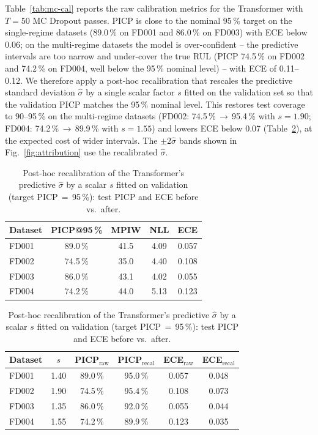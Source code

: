 \documentclass[5p,times,authoryear]{elsarticle}
\begin{document}
Table~\ref{tab:mc-cal} reports the raw calibration metrics for the Transformer with $T{=}50$ MC Dropout passes. PICP is close to the nominal 95\,\% target on the single-regime datasets (89.0\,\% on FD001 and 86.0\,\% on FD003) with ECE below 0.06; on the multi-regime datasets the model is over-confident -- the predictive intervals are too narrow and under-cover the true RUL (PICP 74.5\,\% on FD002 and 74.2\,\% on FD004, well below the 95\,\% nominal level) -- with ECE of 0.11--0.12. We therefore apply a post-hoc recalibration that rescales the predictive standard deviation $\hat\sigma$ by a single scalar factor $s$ fitted on the validation set so that the validation PICP matches the 95\,\% nominal level. This restores test coverage to 90--95\,\% on the multi-regime datasets (FD002: 74.5\,\%\,$\rightarrow$\,95.4\,\% with $s{=}1.90$; FD004: 74.2\,\%\,$\rightarrow$\,89.9\,\% with $s{=}1.55$) and lowers ECE below 0.07 (Table~\ref{tab:recal}), at the expected cost of wider intervals. The $\pm 2\hat\sigma$ bands shown in Fig.~\ref{fig:attribution} use the recalibrated $\hat\sigma$.

\begin{table}[!t]
\centering
\caption{MC Dropout calibration of the Transformer ($T{=}50$), raw (before recalibration).}
\label{tab:mc-cal}
\small
\begin{tabular}{lcccc}
\toprule
Dataset & PICP@95\,\% & MPIW & NLL & ECE \\
\midrule
FD001 & 89.0\,\% & 41.5 & 4.09 & 0.057 \\
FD002 & 74.5\,\% & 35.0 & 4.40 & 0.108 \\
FD003 & 86.0\,\% & 43.1 & 4.02 & 0.055 \\
FD004 & 74.2\,\% & 44.0 & 5.13 & 0.123 \\
\bottomrule
\end{tabular}

\vspace{4pt}
\caption{Post-hoc recalibration of the Transformer's predictive $\hat\sigma$ by a scalar $s$ fitted on validation (target PICP\,$=$\,95\,\%): test PICP and ECE before vs.\ after.}
\label{tab:recal}
\small
\begin{tabular}{lccccc}
\toprule
Dataset & $s$ & PICP$_{\mathrm{raw}}$ & PICP$_{\mathrm{recal}}$ & ECE$_{\mathrm{raw}}$ & ECE$_{\mathrm{recal}}$ \\
\midrule
FD001 & 1.40 & 89.0\,\% & 95.0\,\% & 0.057 & 0.048 \\
FD002 & 1.90 & 74.5\,\% & 95.4\,\% & 0.108 & 0.073 \\
FD003 & 1.35 & 86.0\,\% & 92.0\,\% & 0.055 & 0.044 \\
FD004 & 1.55 & 74.2\,\% & 89.9\,\% & 0.123 & 0.035 \\
\bottomrule
\end{tabular}
\end{table}
\end{document}
